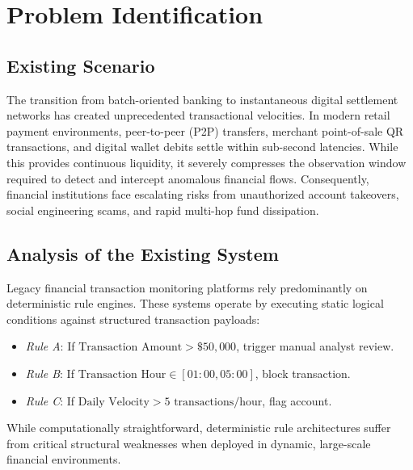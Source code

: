 \chapter{Problem Identification}
\label{chap:problem_identification}

\section{Existing Scenario}
The transition from batch-oriented banking to instantaneous digital settlement networks has created unprecedented transactional velocities. In modern retail payment environments, peer-to-peer (P2P) transfers, merchant point-of-sale QR transactions, and digital wallet debits settle within sub-second latencies. While this provides continuous liquidity, it severely compresses the observation window required to detect and intercept anomalous financial flows. Consequently, financial institutions face escalating risks from unauthorized account takeovers, social engineering scams, and rapid multi-hop fund dissipation.

\section{Analysis of the Existing System}
Legacy financial transaction monitoring platforms rely predominantly on deterministic rule engines. These systems operate by executing static logical conditions against structured transaction payloads:
\begin{itemize}
    \item \textit{Rule A}: If $\text{Transaction Amount} > \$50,000$, trigger manual analyst review.
    \item \textit{Rule B}: If $\text{Transaction Hour} \in [01:00, 05:00]$, block transaction.
    \item \textit{Rule C}: If $\text{Daily Velocity} > 5\text{ transactions/hour}$, flag account.
\end{itemize}

While computationally straightforward, deterministic rule architectures suffer from critical structural weaknesses when deployed in dynamic, large-scale financial environments.


